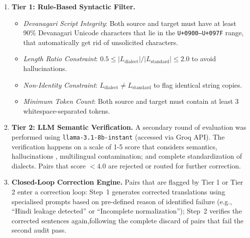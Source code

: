 \begin{enumerate}
    \item \textbf{Tier 1: Rule-Based Syntactic Filter.}
    \begin{itemize}
        \item \emph{Devanagari Script Integrity}: Both source and target must have at least 90\% Devanagari Unicode characters that lie in the \texttt{U+0900--U+097F} range, that automatically get rid of unsolicited characters.
        \item \emph{Length Ratio Constraint}: $0.5 \le |L_{\text{dialect}}| / |L_{\text{standard}}| \le 2.0$ to avoid hallucinations.
        \item \emph{Non-Identity Constraint}: $L_{\text{dialect}} \neq L_{\text{standard}}$ to flag identical string copies.
        \item \emph{Minimum Token Count}: Both source and target must contain at least 3 whitespace-separated tokens.
    \end{itemize}
    \item \textbf{Tier 2: LLM Semantic Verification.} A secondary round of evaluation was performed using \texttt{llama-3.1-8b-instant} (accessed via Groq API).
    The verification happens on a scale of 1-5 score that considers semantics, hallucinations , multilingual contamination; and complete standardization of dialects. Pairs that score $< 4.0$ are rejected or routed for further correction.
    \item \textbf{Closed-Loop Correction Engine.} Pairs that are flagged by Tier 1 or Tier 2 enter a correction loop: Step~1 generates corrected translations using specialised prompts based on pre-defined reason of identified failure (e.g., ``Hindi leakage detected'' or ``Incomplete normalization''); Step~2 verifies the corrected sentences again,following the complete discard of pairs that fail the second audit pass.
\end{enumerate}

